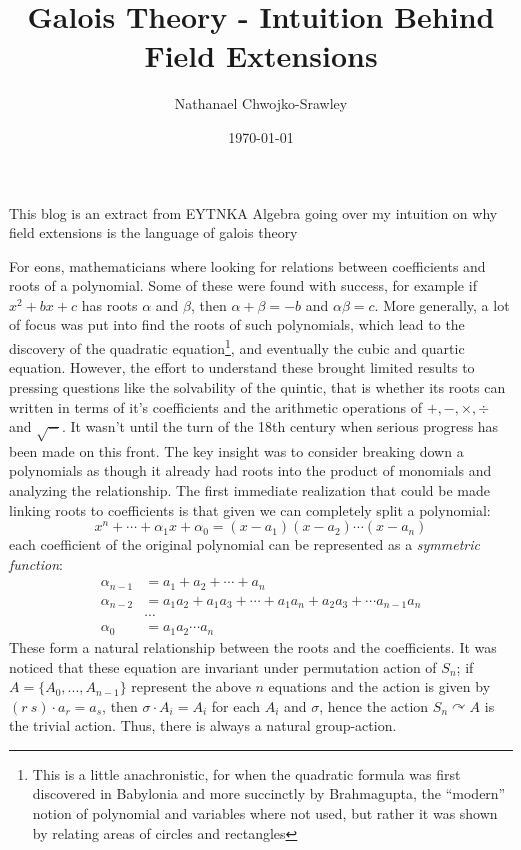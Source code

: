 \documentclass{article}
\title{Galois Theory - Intuition Behind Field Extensions}
\author{Nathanael Chwojko-Srawley}
\date{\today}
\renewcommand{\maketitle}{
    \quad
    \vspace{1em}
  \begin{center}
      \LARGE\bfseries \thetitle \par
      \vspace{0.6em}
      \large
  \end{center}
    \vspace{1em}
}
\newcommand{\actson}{\curvearrowright}
\newcommand{\qn}{\quad\newline}
\begin{document}
\maketitle


This blog is an extract from EYTNKA Algebra \cite{NateAlgebra} going over my intuition on why field extensions
is the language of galois theory

\qn
For eons, mathematicians where looking for relations between coefficients and roots of a polynomial. Some of
these were found with success, for example if $x^2+bx+c$ has roots $\alpha$ and $\beta$, then $\alpha + \beta
= -b$ and $\alpha\beta = c$. More generally, a lot of focus was put into find the roots of such polynomials,
which lead to the discovery of the quadratic equation\footnote{This is a little anachronistic, for when the
  quadratic formula was first discovered in Babylonia and more succinctly by Brahmagupta, the ``modern''
  notion of polynomial and variables where not used, but rather it was shown by relating areas of circles and
rectangles}, and eventually the cubic and quartic equation. However, the effort to understand these brought
limited results to pressing questions like the solvability of the quintic, that is whether its roots can
written in terms of it's coefficients and the arithmetic operations of $+, -, \times, \div$ and $\sqrt{-}$. It
wasn't until the turn of the 18th century when serious progress has been made on this front. The key insight
was to consider breaking down a polynomials as though it already had roots into the product of monomials and
analyzing the relationship. The first immediate realization that could be made linking roots to  coefficients
is that given we can completely split a polynomial:
\[
	x^n + \cdots + \alpha_1x + \alpha_0 = (x-a_1)(x-a_2)\cdots(x-a_n)
\]
each coefficient of the original polynomial can be represented as a \emph{symmetric function}:
\begin{align*}
	\alpha_{n-1} &= a_1 + a_2 + \cdots + a_n\\
	\alpha_{n-2} &= a_1a_2 + a_1a_3 + \cdots + a_1a_n + a_2a_3 + \cdots a_{n-1}a_n\\
		 &\cdots\\
	\alpha_0 &= a_1a_2\cdots a_n
\end{align*}
These form a natural relationship between the roots and the coefficients. It was noticed that these equation
are invariant under permutation action of $S_n$; if $A = \{A_0, ..., A_{n-1}\}$ represent the above $n$
equations and the action is given by $(r\ s)\cdot a_r = a_s$, then $\sigma \cdot A_i = A_i$ for each $A_i$ and
$\sigma$, hence the action $S_n \actson A$ is the trivial action. Thus, there is always a natural
group-action.
\end{document}
